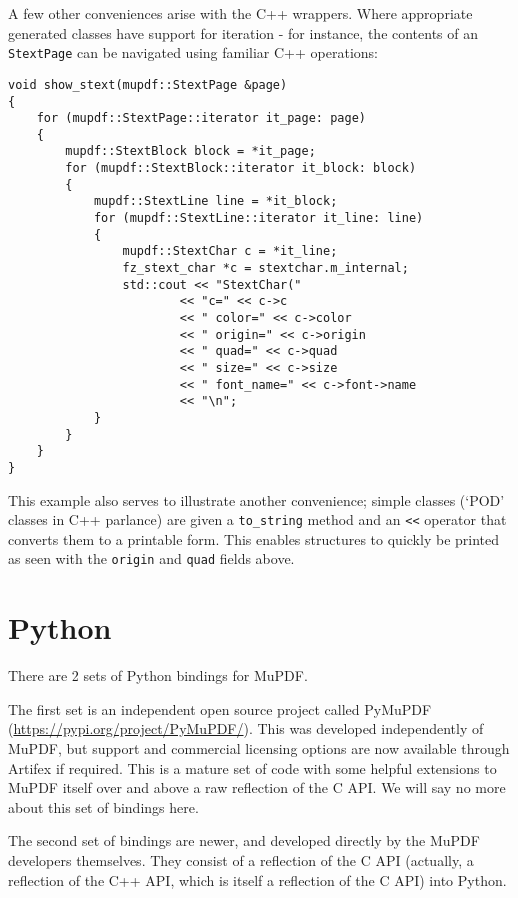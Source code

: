 \documentclass[oneside]{book}
\begin{document}
A few other conveniences arise with the C++ wrappers. Where appropriate generated classes have support for iteration - for instance, the contents of an \texttt{StextPage} can be navigated using familiar C++ operations:

\begin{lstlisting}
void show_stext(mupdf::StextPage &page)
{
    for (mupdf::StextPage::iterator it_page: page)
    {
        mupdf::StextBlock block = *it_page;
        for (mupdf::StextBlock::iterator it_block: block)
        {
            mupdf::StextLine line = *it_block;
            for (mupdf::StextLine::iterator it_line: line)
            {
                mupdf::StextChar c = *it_line;
                fz_stext_char *c = stextchar.m_internal;
                std::cout << "StextChar("
                        << "c=" << c->c
                        << " color=" << c->color
                        << " origin=" << c->origin
                        << " quad=" << c->quad
                        << " size=" << c->size
                        << " font_name=" << c->font->name
                        << "\n";
            }
        }
    }
}
\end{lstlisting}

This example also serves to illustrate another convenience; simple classes (`POD' classes in C++ parlance) are given a \texttt{to\_string} method and an \texttt{<<} operator that converts them to a printable form. This enables structures to quickly be printed as seen with the \texttt{origin} and \texttt{quad} fields above.

\section{Python}

There are 2 sets of Python bindings for MuPDF.

The first set is an independent open source project called PyMuPDF (\url{https://pypi.org/project/PyMuPDF/}). This was developed independently of MuPDF, but support and commercial licensing options are now available through Artifex if required. This is a mature set of code with some helpful extensions to MuPDF itself over and above a raw reflection of the C API. We will say no more about this set of bindings here.

The second set of bindings are newer, and developed directly by the MuPDF developers themselves. They consist of a reflection of the C API (actually, a reflection of the C++ API, which is itself a reflection of the C API) into Python.
\end{document}

